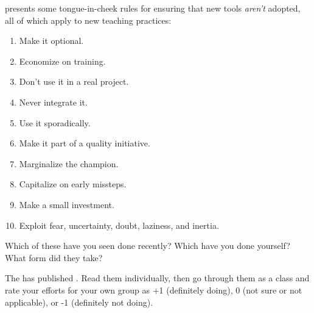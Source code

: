 \cite{Farm2006} presents some tongue-in-cheek rules for ensuring that new tools \emph{aren't} adopted,
all of which apply to new teaching practices:

\begin{enumerate}

\item
  Make it optional.

\item
  Economize on training.

\item
  Don't use it in a real project.

\item
  Never integrate it.

\item
  Use it sporadically.

\item
  Make it part of a quality initiative.

\item
  Marginalize the champion.

\item
  Capitalize on early missteps.

\item
  Make a small investment.

\item
  Exploit fear, uncertainty, doubt, laziness, and inertia.

\end{enumerate}

Which of these have you seen done recently?
Which have you done yourself?
What form did they take?


The 
has published .
Read them individually,
then go through them as a class
and rate your efforts for your own group as +1 (definitely doing),
0 (not sure or not applicable),
or -1 (definitely not doing).
